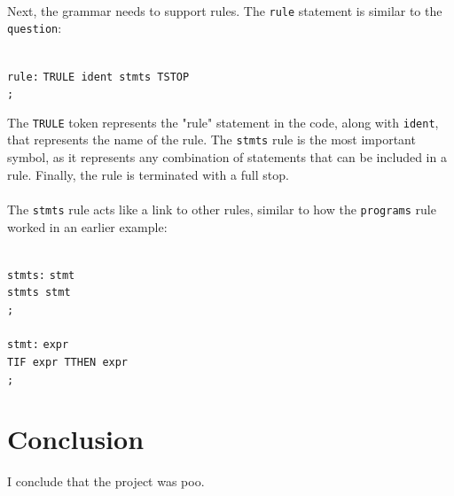 \documentclass[12pt]{report}
\begin{document}
\\
Next, the grammar needs to support rules.  The \texttt{rule} statement is similar to the \texttt{question}:\\
\\
\begin{tabbing}
\texttt{rule:} \= \texttt{TRULE ident stmts TSTOP}\\
\> \texttt{;}\\
\end{tabbing}
The \texttt{TRULE} token represents the "rule" statement in the code, along with \texttt{ident}, that represents the name of the rule.  The \texttt{stmts} rule is the most important symbol, as it represents any combination of statements that can be included in a rule.  Finally, the rule is terminated with a full stop.\\
\\
The \texttt{stmts} rule acts like a link to other rules, similar to how the \texttt{programs} rule worked in an earlier example:\\
\\
\begin{tabbing}
	\texttt{stmts:} \= \texttt{stmt}\\
	\> \texttt{\textbar \space stmts stmt}\\
	\> \texttt{;}\\
	\\
	\texttt{stmt:} \= \texttt{expr}\\
	\> \texttt{\textbar \space TIF expr TTHEN expr}\\
	\> \texttt{;}\\
\end{tabbing}

\chapter{Conclusion}
I conclude that the project was poo.



\end{document}
